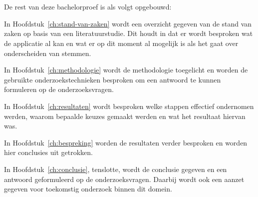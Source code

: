 \section{}%
\label{sec:opzet-bachelorproef}


De rest van deze bachelorproef is als volgt opgebouwd:

In Hoofdstuk~\ref{ch:stand-van-zaken} wordt een overzicht gegeven van de stand van zaken op basis van een literatuurstudie. Dit houdt in dat er wordt besproken wat de applicatie al kan en wat er op dit moment al mogelijk is als het gaat over onderscheiden van stemmen.

In Hoofdstuk~\ref{ch:methodologie} wordt de methodologie toegelicht en worden de gebruikte onderzoekstechnieken besproken om een antwoord te kunnen formuleren op de onderzoeksvragen.

In Hoofdstuk~\ref{ch:resultaten} wordt besproken welke stappen effectief ondernomen werden, waarom bepaalde keuzes gemaakt werden en wat het resultaat hiervan was.

In Hoofdstuk~\ref{ch:bespreking} worden de resultaten verder besproken en worden hier conclusies uit getrokken.

In Hoofdstuk~\ref{ch:conclusie}, tenslotte, wordt de conclusie gegeven en een antwoord geformuleerd op de onderzoeksvragen. Daarbij wordt ook een aanzet gegeven voor toekomstig onderzoek binnen dit domein.